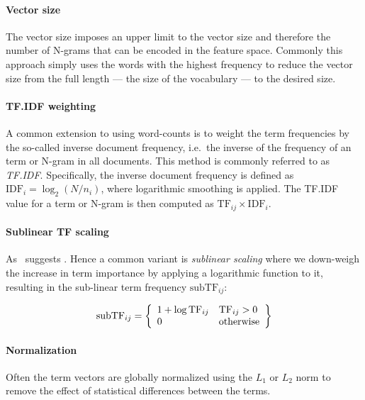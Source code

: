 \paragraph{Vector size} The vector size imposes an upper limit to the vector size and therefore the number of N-grams that can be encoded in the feature space. Commonly this approach simply uses the words with the highest frequency to reduce the vector size from the full length --- the size of the vocabulary --- to the desired size.

\paragraph{TF.IDF weighting}
\label{par:TF.IDF weighting}
A common extension to using word-counts is to weight the term frequencies by the so-called inverse document frequency, i.e.\ the inverse of the frequency of an term or N-gram in all documents. This method is commonly referred to as \emph{TF.IDF}. Specifically, the inverse document frequency is defined as $\text{IDF}_i = \log_2 (N/n_i)$, where logarithmic smoothing is applied. The TF.IDF value for a term or N-gram is then computed as $\text{TF}_{ij} \times \text{IDF}_i$.

\paragraph{Sublinear TF scaling}
\label{par:Sublinear TF scaling}
 As~\cite[Chapter 6.4.1, p.~126]{Manning:2008aa} suggests . Hence a common variant is \emph{sublinear scaling} where we down-weigh the increase in term importance by applying a logarithmic function to it, resulting in the sub-linear term frequency $\text{subTF}_{ij}$:

\begin{displaymath}
  \text{subTF}_{ij} = \left \{ \begin{array}{l l} 1+\log \text{TF}_{ij} & \text{TF}_{ij} > 0 \\
  0 & \text{otherwise}
\end{array} \right \}
\end{displaymath}

\paragraph{Normalization} Often the term vectors are globally normalized using the $L_1$ or $L_2$ norm to remove the effect of statistical differences between the terms.

